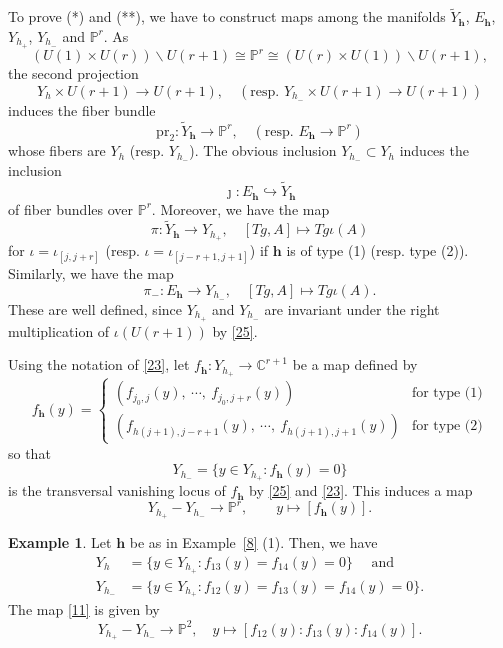 \documentclass[11pt]{article}
\theoremstyle{definition}
\newtheorem{example}[theo]{Example}
\numberwithin{equation}{section}
\numberwithin{equation}{section}
\newcommand{\C}{\mathbb{C}}
\newcommand{\PP}{\mathbb{P}}
\newcommand\tY{{\widetilde{Y}}}
\newcommand\lra{\longrightarrow }
\newcommand\beq{\begin{equation}}
\newcommand\eeq{\end{equation}}
\newcommand\pr{\mathrm{pr}}
\newcommand\bh{\mathbf{h}}
\begin{document}
To prove (*) and (**), we have to construct maps among the manifolds $\tY_\bh$, $E_\bh$, $Y_{h_+}$, $Y_{h_-}$ and $\PP^r$.  
As \beq\label{n25}
 \left(U(1)\times U(r)\right)\backslash U(r+1)\cong \PP^r \cong \left(U(r)\times U(1)\right)\backslash U(r+1),\eeq 
the second projection 
$$Y_h\times U(r+1)\lra U(r+1), \quad (\text{resp. } Y_{h_-}\times U(r+1)\lra U(r+1) )$$ 
induces the fiber bundle  
\beq \label{9} \pr_2:\tY_{\bh}\lra \PP^r, \quad (\text{resp. } E_\bh\lra \PP^r )\eeq
whose fibers are $Y_h$ (resp. $Y_{h_-}$). The obvious inclusion $Y_{h_-}\subset Y_h$ induces the inclusion 
	\beq\label{n19}\jmath:E_\bh\hookrightarrow \tY_\bh\eeq
of fiber bundles over $\PP^r$. 
Moreover, we have the map  
	\beq\label{n20} \pi:\tY_\bh \lra Y_{h_+}, \quad [Tg,A]\mapsto Tg\iota(A)\eeq 
	for $\iota=\iota_{[j,j+r]}$ (resp. $\iota=\iota_{[j-r+1,j+1]}$) if $\bh$ is of type (1) (resp. type (2)). Similarly, we have the map  
	\beq\label{n22} \pi_-: E_\bh\lra Y_{h_-}, \quad [Tg,A]\mapsto Tg\iota(A).\eeq 
	These are well defined, since $Y_{h_+}$ and $Y_{h_-}$ are invariant under the right multiplication of $\iota(U(r+1))$ by \eqref{25}.


Using the notation of \eqref{23}, let $f_\bh:Y_{h_+}\to \C^{r+1}$ be a map defined by 
	\begin{equation*}
		f_\bh(y)=\begin{cases}
			(f_{j_0,j}(y),~\cdots ,~ f_{j_0,j+r}(y)) &\text{for type (1)}\\
			(f_{h(j+1),j-r+1}(y),~\cdots ,~ f_{h(j+1),j+1}(y)) &\text{for type (2)}
		\end{cases}
	\end{equation*}
	so that 
	\beq \label{12} Y_{h_-}=\{y\in Y_{h_+}:f_\bh(y)=0\}\eeq
	is the transversal vanishing locus of $f_\bh$ 
	by \eqref{25} and \eqref{23}. This induces a map 
	\beq  \label{11} Y_{h_+}-Y_{h_-}\lra  \PP^r, \qquad y\mapsto [f_\bh(y)].\eeq
	

\begin{example}
	Let $\bh$ be as in Example~\ref{8} (1). Then, we have 
	\begin{equation*}
		\begin{split}
			Y_{h}&=\{y\in Y_{h_+}:f_{13}(y)=f_{14}(y)=0\} \quad \text{ and}\\
			Y_{h_-}&=\{y\in Y_{h_+}:f_{12}(y)=f_{13}(y)=f_{14}(y)=0\}.
		\end{split}
	\end{equation*}
	The map \eqref{11} is given by
	\[Y_{h_+}-Y_{h_-}\lra \PP^{2}, \quad y\mapsto [f_{12}(y):f_{13}(y):f_{14}(y)].\]
	\end{example}
\end{document}
